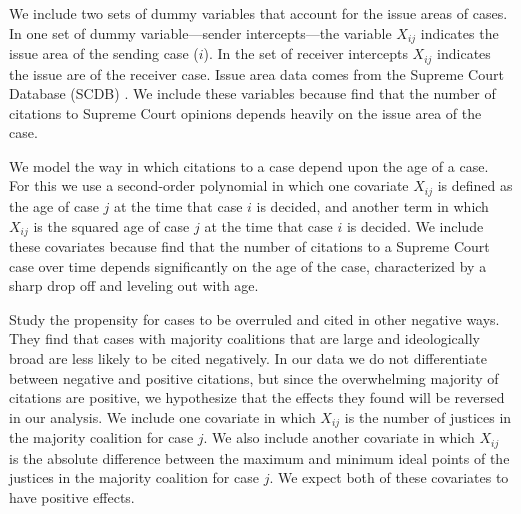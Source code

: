 \documentclass[headsepline=true, abstracton]{scrartcl}
\begin{document}
We include two sets of dummy variables that account for the issue areas of cases. In one set of dummy variable---sender intercepts---the variable $X_{ij}$ indicates the issue area of the sending case ($i$). In the set of receiver intercepts $X_{ij}$ indicates the issue are of the receiver case. Issue area data comes from the Supreme Court Database (SCDB) \citep{spaeth2014supreme}. We include these variables because \citet{cross2010determinants} find that the number of citations to Supreme Court opinions depends heavily on the issue area of the case.

We model the way in which citations to a case depend upon the age of a case. For this we use a second-order polynomial in which one covariate $X_{ij}$ is defined as the age of case $j$ at the time that case $i$ is decided, and another term in which $X_{ij}$ is the squared age of case $j$ at the time that case $i$ is decided. We include these covariates because \citet{black2013citation} find that the number of citations to a Supreme Court case over time depends significantly on the age of the case, characterized by a sharp drop off and leveling out with age. 

\citet{benjamin2012standing} Study the propensity for cases to be overruled and cited in other negative ways. They find that cases with majority coalitions that are large and ideologically broad are less likely to be cited negatively. In our data we do not differentiate between negative and positive citations, but since the overwhelming majority of citations are positive, we hypothesize that the effects they found will be reversed in our analysis. We include one covariate in which $X_{ij}$ is the number of justices in the majority coalition for case $j$. We also include another covariate in which $X_{ij}$ is the absolute difference between the maximum and minimum ideal points of the justices in the majority coalition for case $j$. We expect both of these covariates to have positive effects.



\end{document}
